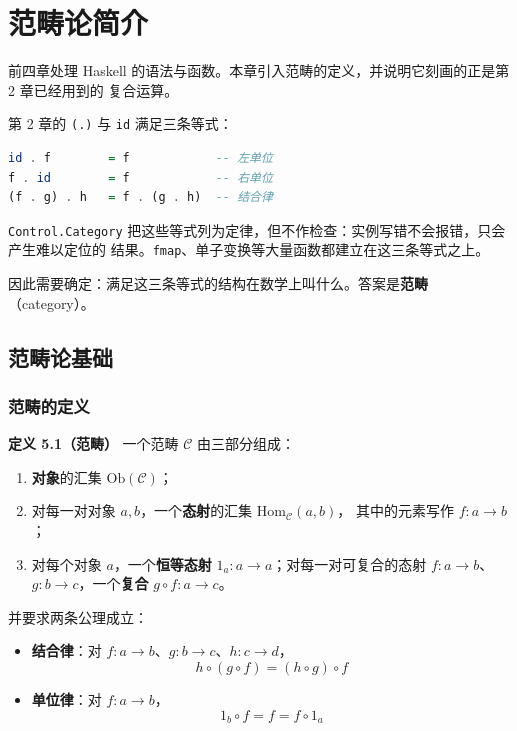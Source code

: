 \chapter{范畴论简介}\label{ux8303ux7574ux8bbaux7b80ux4ecb}

前四章处理 Haskell 的语法与函数。本章引入范畴的定义，并说明它刻画的正是第 2 章已经用到的
复合运算。

第 2 章的 \passthrough{\lstinline!(.)!} 与 \passthrough{\lstinline!id!} 满足三条等式：

\begin{lstlisting}[language=Haskell]
id . f        = f            -- 左单位
f . id        = f            -- 右单位
(f . g) . h   = f . (g . h)  -- 结合律
\end{lstlisting}

\passthrough{\lstinline!Control.Category!} 把这些等式列为定律，但不作检查：实例写错不会报错，只会产生难以定位的
结果。\passthrough{\lstinline!fmap!}、单子变换等大量函数都建立在这三条等式之上。

因此需要确定：满足这三条等式的结构在数学上叫什么。答案是\textbf{范畴}（category）。

\section{范畴论基础}\label{ux8303ux7574ux8bbaux57faux7840}

\subsection{范畴的定义}\label{ux8303ux7574ux7684ux5b9aux4e49}

\textbf{定义 5.1（范畴）} 一个范畴 \(\mathcal{C}\) 由三部分组成：

\begin{enumerate}
\def\labelenumi{\arabic{enumi}.}
\tightlist
\item
  \textbf{对象}的汇集 \(\mathrm{Ob}(\mathcal{C})\)；
\item
  对每一对对象 \(a, b\)，一个\textbf{态射}的汇集 \(\mathrm{Hom}_{\mathcal{C}}(a, b)\)，
  其中的元素写作 \(f \colon a \to b\)；
\item
  对每个对象 \(a\)，一个\textbf{恒等态射} \(1_a \colon a \to a\)；对每一对可复合的态射
  \(f \colon a \to b\)、\(g \colon b \to c\)，一个\textbf{复合} \(g \circ f \colon a \to c\)。
\end{enumerate}

并要求两条公理成立：

\begin{itemize}
\tightlist
\item
  \textbf{结合律}：对 \(f \colon a \to b\)、\(g \colon b \to c\)、\(h \colon c \to d\)，
  \[h \circ (g \circ f) = (h \circ g) \circ f\]
\item
  \textbf{单位律}：对 \(f \colon a \to b\)，
  \[1_b \circ f = f = f \circ 1_a\]
\end{itemize}

